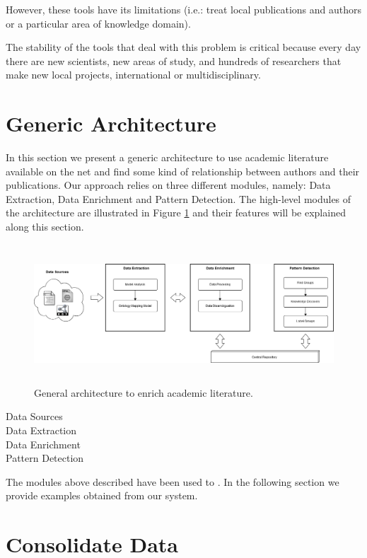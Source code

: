 \documentclass[11pt]{article}
\begin{document}
However, these tools have its limitations (i.e.: treat local publications and authors or a particular area of knowledge domain). 

The stability of the tools that deal with this problem is critical because every day there are new scientists, new areas of study, and hundreds of researchers that make new local projects, international or multidisciplinary.

\section{Generic Architecture}
\label{label:arch}

In this section we present a generic architecture to use academic literature available on the net and find some kind of relationship between authors and their publications. Our approach relies on three different modules, namely: Data Extraction, Data Enrichment and Pattern Detection. The high-level modules of the architecture are illustrated in Figure \ref{fig:achitecture} and their features will be explained along this section.

 \begin{figure}[ht!]
	\centering
		\includegraphics[height=5.2cm]{platformDiagram.png}
	\caption{General architecture to enrich academic literature.}
	\label{fig:achitecture}
\end{figure}

\begin{description}
\item[Data Sources] 
\item[Data Extraction]
\item[Data Enrichment]
\item[Pattern Detection] 
\end{description}

The modules above described have been used to . In the following section we provide examples obtained from our system.


\section{Consolidate Data}
\label{label:consolidatedate}
\end{document}
